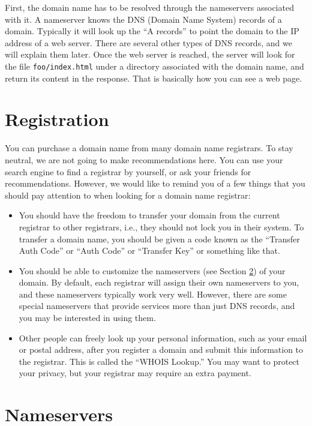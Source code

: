 \documentclass[12pt,]{krantz}
\theoremstyle{definition}
\theoremstyle{definition}
\theoremstyle{definition}
\theoremstyle{remark}
\begin{document}
First, the domain name has to be resolved through the nameservers
associated with it. A nameserver knows the DNS (Domain Name System)
records of a domain. Typically it will look up the ``A records'' to
point the domain to the IP address of a web server. There are several
other types of DNS records, and we will explain them later. Once the web
server is reached, the server will look for the file
\texttt{foo/index.html} under a directory associated with the domain
name, and return its content in the response. That is basically how you
can see a web page.

\hypertarget{registration}{%
\section{Registration}\label{registration}}

You can purchase a domain name from many domain name registrars. To stay
neutral, we are not going to make recommendations here. You can use your
search engine to find a registrar by yourself, or ask your friends for
recommendations. However, we would like to remind you of a few things
that you should pay attention to when looking for a domain name
registrar:

\begin{itemize}
\item
  You should have the freedom to transfer your domain from the current
  registrar to other registrars, i.e., they should not lock you in their
  system. To transfer a domain name, you should be given a code known as
  the ``Transfer Auth Code'' or ``Auth Code'' or ``Transfer Key'' or
  something like that.
\item
  You should be able to customize the nameservers (see Section
  \ref{nameservers}) of your domain. By default, each registrar will
  assign their own nameservers to you, and these nameservers typically
  work very well. However, there are some special nameservers that
  provide services more than just DNS records, and you may be interested
  in using them.
\item
  Other people can freely look up your personal information, such as
  your email or postal address, after you register a domain and submit
  this information to the registrar. This is called the ``WHOIS
  Lookup.'' You may want to protect your privacy, but your registrar may
  require an extra payment.
\end{itemize}

\hypertarget{nameservers}{%
\section{Nameservers}\label{nameservers}}
\end{document}
